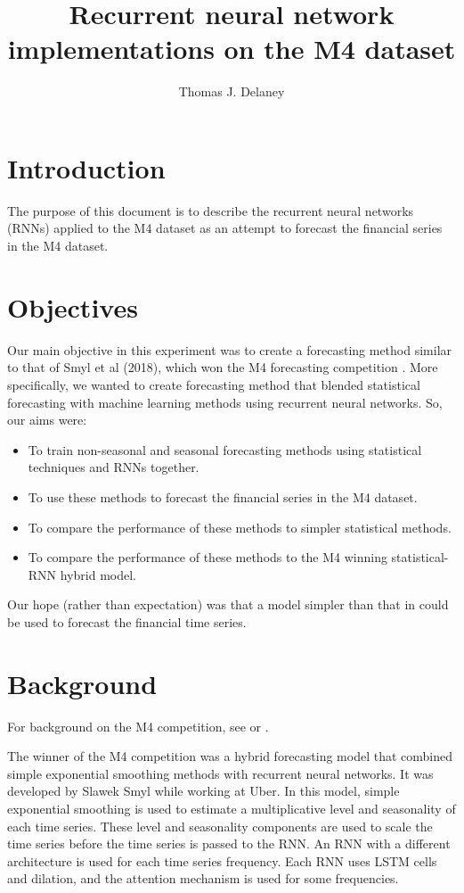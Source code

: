 \documentclass[a4paper,12pt]{article}
\title{Recurrent neural network implementations on the M4 dataset}
\date{}
\author{Thomas J. Delaney}
\theoremstyle{definition}
\begin{document}
\maketitle

\tableofcontents

\newpage

\section{Introduction}
The purpose of this document is to describe the recurrent neural networks (RNNs) applied to the M4 dataset as an attempt to forecast the financial series in the M4 dataset.

\section{Objectives}
Our main objective in this experiment was to create a forecasting method similar to that of Smyl et al (2018), which won the M4 forecasting competition \cite{smyl}. More specifically, we wanted to create forecasting method that blended statistical forecasting with machine learning methods using recurrent neural networks. So, our aims were:
\begin{itemize}
  \item To train non-seasonal and seasonal forecasting methods using statistical techniques and RNNs together.
  \item To use these methods to forecast the financial series in the M4 dataset.
  \item To compare the performance of these methods to simpler statistical methods.
  \item To compare the performance of these methods to the M4 winning statistical-RNN hybrid model.
\end{itemize}
Our hope (rather than expectation) was that a model simpler than that in \cite{smyl} could be used to forecast the financial time series.

\section{Background}
For background on the M4 competition, see \cite{m4} or \cite{meta}.

The winner of the M4 competition was a hybrid forecasting model that combined simple exponential smoothing methods with recurrent neural networks. It was developed by Slawek Smyl while working at Uber. In this model, simple exponential smoothing is used to estimate a multiplicative level and seasonality of each time series. These level and seasonality components are used to scale the time series before the time series is passed to the RNN. An RNN with a different architecture is used for each time series frequency. Each RNN uses LSTM cells and dilation, and the  attention mechanism is used for some frequencies. 
\end{document}
